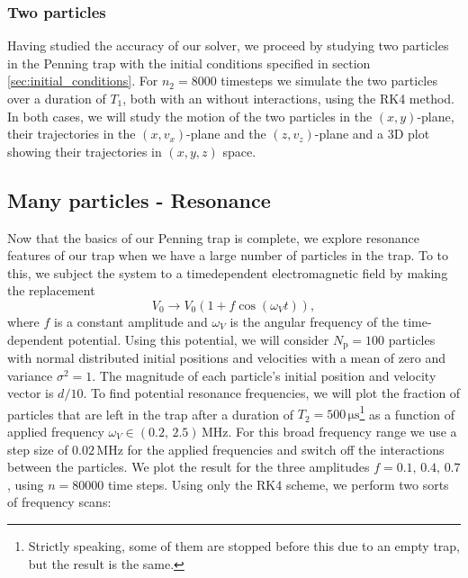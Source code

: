 \subsubsection{Two particles}
Having studied the accuracy of our solver, we proceed by studying two particles in the Penning trap with the initial conditions specified in section \ref{sec:initial_conditions}. For $n_2=8000$ timesteps we simulate the two particles over a duration of $T_1$, both with an without interactions, using the RK4 method. In both cases, we will study the motion of the two particles in the $(x,y)$-plane, their trajectories in the $(x,v_x)$-plane and the $(z,v_z)$-plane and a 3D plot showing their trajectories in $(x,y,z)$ space.   

\subsection{Many particles - Resonance}\label{subsec_methods:many_particles_resonance}
Now that the basics of our Penning trap is complete, we explore resonance features of our trap when we have a large number of particles in the trap. To to this, we subject the system to a timedependent electromagnetic field  by making the replacement 
\begin{equation}
    V_0 \to V_0 (1 + f \cos(\omega_V t)), \label{eq:p9_time_dep_potential}
\end{equation} 
where $f$ is a constant amplitude and $\omega_V$ is the angular frequency of the time-dependent potential. Using this potential, we will consider $N_\mathrm{p}=100$ particles with normal distributed initial positions and velocities with a mean of zero and variance $\sigma^2=1$. The magnitude of each particle's initial position and velocity vector is $d/10$. To find potential resonance frequencies, we will plot the fraction of particles that are left in the trap after a duration of $T_2=500\,\mathrm{\mu s}$\footnote{Strictly speaking, some of them are stopped before this due to an empty trap, but the result is the same.} as a function of applied frequency $\omega_V\in(0.2,\,2.5)\,\mathrm{MHz}$. For this broad frequency range we use a step size of $0.02\,\mathrm{MHz}$ for the applied frequencies and switch off the interactions between the particles. We plot the result for the three amplitudes $f=0.1,\,0.4,\,0.7$, using $n=80000$ time steps. Using only the RK4 scheme, we perform two sorts of frequency scans:


